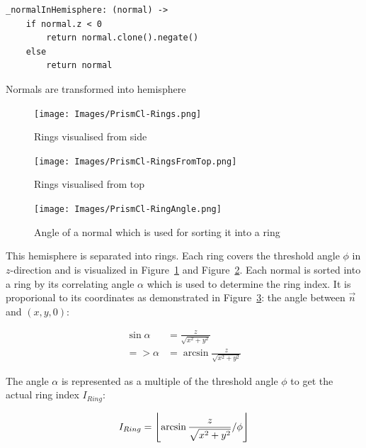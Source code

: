 \documentclass[../ClassicThesis.tex]{subfiles}
\begin{document}
\begin{listing}[!h]
\centering
\begin{verbatim}
_normalInHemisphere: (normal) ->
    if normal.z < 0
        return normal.clone().negate()
    else
        return normal
\end{verbatim}
\caption{Normals are transformed into hemisphere}
\label{lst:_normalInHemisphere}
\end{listing}

\begin{figure}
    \texttt{[image: Images/PrismCl-Rings.png]}
    \caption{Rings visualised from side}
    \label{fig:rings_FromSide}
\end{figure}

\begin{figure}
    \texttt{[image: Images/PrismCl-RingsFromTop.png]}
    \caption{Rings visualised from top}
    \label{fig:rings_FromTop}
\end{figure}

\begin{figure}
    \texttt{[image: Images/PrismCl-RingAngle.png]}
    \caption{Angle of a normal which is used for sorting it into a ring}
    \label{fig:ringAngle}
\end{figure}


This hemisphere is separated into rings. Each ring covers the threshold angle $\phi$ in $z$-direction and is visualized in Figure~\ref{fig:rings_FromSide} and Figure~\ref{fig:rings_FromTop}. Each normal is sorted into a ring by its correlating angle $\alpha$ which is used to determine the ring index. It is proporional to its coordinates as demonstrated in Figure~\ref{fig:ringAngle}: the angle between $\vec{n}$ and $(x,y,0)$:

\begin{equation*}
\begin{split}
    \sin{\alpha} & = \frac{z}{ \sqrt{x^{2} + y^{2}} } \\
    => \alpha  & = \arcsin{ \frac{z}{ \sqrt{x^{2} + y^{2}} } }
\end{split}
\end{equation*}


The angle $\alpha$ is represented as a multiple of the threshold angle $\phi$ to get the actual ring index $I_{Ring}$:

\begin{equation*}
    I_{Ring} = \floor*{
                    \arcsin{
                        \frac{z}{ \sqrt{ x^{2} + y^{2} } }
                    }
                    / \phi
                }
\end{equation*}
\end{document}
